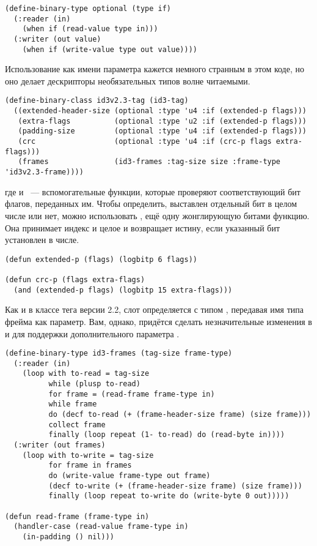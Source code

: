 \begin{lstlisting}
(define-binary-type optional (type if)
  (:reader (in)
    (when if (read-value type in)))
  (:writer (out value)
    (when if (write-value type out value))))
\end{lstlisting}

Использование  как имени параметра кажется немного странным в этом коде, но оно
делает дескрипторы необязательных типов волне читаемыми.

\begin{lstlisting}
(define-binary-class id3v2.3-tag (id3-tag)
  ((extended-header-size (optional :type 'u4 :if (extended-p flags)))
   (extra-flags          (optional :type 'u2 :if (extended-p flags)))
   (padding-size         (optional :type 'u4 :if (extended-p flags)))
   (crc                  (optional :type 'u4 :if (crc-p flags extra-flags)))
   (frames               (id3-frames :tag-size size :frame-type 'id3v2.3-frame))))
\end{lstlisting}

\noindent{}где  и ~--- вспомогательные функции, которые проверяют
соответствующий бит флагов, переданных им. Чтобы определить, выставлен отдельный бит в
целом числе или нет, можно использовать , ещё одну жонглирующую битами
функцию. Она принимает индекс и целое и возвращает истину, если указанный бит установлен в
числе.

\begin{lstlisting}
(defun extended-p (flags) (logbitp 6 flags))

(defun crc-p (flags extra-flags)
  (and (extended-p flags) (logbitp 15 extra-flags)))
\end{lstlisting}

Как и в классе тега версии 2.2, слот  определяется с типом ,
передавая имя типа фрейма как параметр. Вам, однако, придётся сделать незначительные
изменения в  и  для поддержки дополнительного параметра
.

\begin{lstlisting}
(define-binary-type id3-frames (tag-size frame-type)
  (:reader (in)
    (loop with to-read = tag-size
          while (plusp to-read)
          for frame = (read-frame frame-type in)
          while frame
          do (decf to-read (+ (frame-header-size frame) (size frame)))
          collect frame
          finally (loop repeat (1- to-read) do (read-byte in))))
  (:writer (out frames)
    (loop with to-write = tag-size
          for frame in frames
          do (write-value frame-type out frame)
          (decf to-write (+ (frame-header-size frame) (size frame)))
          finally (loop repeat to-write do (write-byte 0 out)))))

(defun read-frame (frame-type in)
  (handler-case (read-value frame-type in)
    (in-padding () nil)))
\end{lstlisting}

